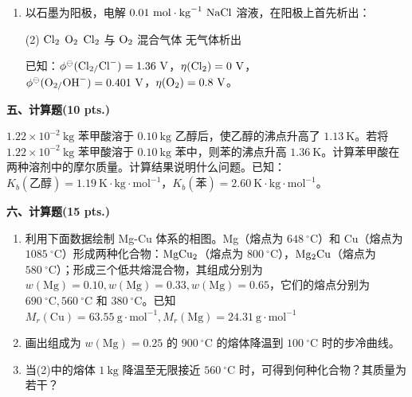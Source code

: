 \begin{enumerate}[label=\arabic*., start=1, itemsep=1.5ex]
    但这些公式只适于绝热可逆过程的是：
    \begin{tasks}(4)
        \task (1), (2)
        \task (3), (4)
        \task (5), (6)
        \task (4), (5)
    \end{tasks}

    \item 以石墨为阳极，电解 $0.01\ \text{mol}\cdot\text{kg}^{-1}\ \ce{NaCl}$ 溶液，在阳极上首先析出：
    \begin{tasks}(2)
        \task $\ce{Cl2}$
        \task $\ce{O2}$
        \task $\ce{Cl2}$ 与 $\ce{O2}$ 混合气体
        \task 无气体析出
    \end{tasks}
    已知：$\phi^\ominus(\ce{Cl2/Cl-}) = 1.36\ \text{V}$，$\eta(\ce{Cl2}) = 0\ \text{V}$，\\
    \hspace*{3em}$\phi^\ominus(\ce{O2/OH-}) = 0.401\ \text{V}$，$\eta(\ce{O2}) = 0.8\ \text{V}$。
\end{enumerate}

\vspace{0.5cm}
\noindent\textbf{五、计算题(10 pts.)}

$1.22 \times 10^{-2}\ \text{kg}$ 苯甲酸溶于 $0.10\ \text{kg}$ 乙醇后，使乙醇的沸点升高了 $1.13\ \text{K}$。若将 $1.22 \times 10^{-2}\ \text{kg}$ 苯甲酸溶于 $0.10\ \text{kg}$ 苯中，则苯的沸点升高 $1.36\ \text{K}$。计算苯甲酸在两种溶剂中的摩尔质量。计算结果说明什么问题。已知：$K_b(\text{乙醇}) = 1.19\ \text{K}\cdot\text{kg}\cdot\text{mol}^{-1}$，$K_b(\text{苯}) = 2.60\ \text{K}\cdot\text{kg}\cdot\text{mol}^{-1}$。

\vspace{0.5cm}
\noindent\textbf{六、计算题(15 pts.)}

\begin{enumerate}[label=（\arabic*）, itemsep=1ex]
    \item 利用下面数据绘制 Mg-Cu 体系的相图。Mg（熔点为 $648\ ^\circ\text{C}$）和 Cu（熔点为 $1085\ ^\circ\text{C}$）形成两种化合物：$\ce{MgCu2}$（熔点为 $800\ ^\circ\text{C}$），$\ce{Mg2Cu}$（熔点为 $580\ ^\circ\text{C}$）；形成三个低共熔混合物，其组成分别为 $w(\text{Mg})=0.10, w(\text{Mg})=0.33, w(\text{Mg})=0.65$，它们的熔点分别为 $690\ ^\circ\text{C}, 560\ ^\circ\text{C}$ 和 $380\ ^\circ\text{C}$。已知 $M_r(\text{Cu})=63.55\ \text{g}\cdot\text{mol}^{-1}, M_r(\text{Mg})=24.31\ \text{g}\cdot\text{mol}^{-1}$
    \item 画出组成为 $w(\text{Mg})=0.25$ 的 $900\ ^\circ\text{C}$ 的熔体降温到 $100\ ^\circ\text{C}$ 时的步冷曲线。
    \item 当(2)中的熔体 $1\ \text{kg}$ 降温至无限接近 $560\ ^\circ\text{C}$ 时，可得到何种化合物？其质量为若干？
\end{enumerate}

